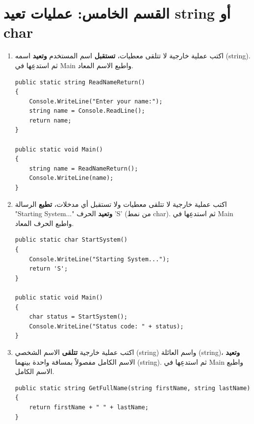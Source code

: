 \documentclass[14pt]{extarticle}
\begin{document}
\filbreak
\section*{القسم الخامس: عمليات تعيد \textenglish{string} أو \textenglish{char}}

\begin{enumerate}[resume, itemsep=1em]

\item اكتب عملية خارجية لا تتلقى معطيات، \textbf{تستقبل} اسم المستخدم \textbf{وتعيد} اسمه (\textenglish{string}). ثم استدعِها في \textenglish{Main} واطبع الاسم المعاد.
\ifwithsols
\begin{boxSolution}
\begin{english}
\begin{verbatim}
public static string ReadNameReturn()
{
    Console.WriteLine("Enter your name:");
    string name = Console.ReadLine();
    return name;
}

public static void Main()
{
    string name = ReadNameReturn();
    Console.WriteLine(name);
}
\end{verbatim}
\end{english}
\end{boxSolution}
\fi
\filbreak

\item اكتب عملية خارجية لا تتلقى معطيات ولا تستقبل أي مدخلات، \textbf{تطبع} الرسالة \textenglish{"Starting System..."} \textbf{وتعيد} الحرف \textenglish{'S'} (من نمط \textenglish{char}). ثم استدعِها في \textenglish{Main} واطبع الحرف المعاد.
\ifwithsols
\begin{boxSolution}
\begin{english}
\begin{verbatim}
public static char StartSystem()
{
    Console.WriteLine("Starting System...");
    return 'S';
}

public static void Main()
{
    char status = StartSystem();
    Console.WriteLine("Status code: " + status);
}
\end{verbatim}
\end{english}
\end{boxSolution}
\fi
\filbreak

\item اكتب عملية خارجية \textbf{تتلقى} الاسم الشخصي (\textenglish{string}) واسم العائلة (\textenglish{string})، \textbf{وتعيد} الاسم الكامل مفصولاً بمسافة واحدة بينهما (\textenglish{string}). ثم استدعِها في \textenglish{Main} واطبع الاسم الكامل.
\ifwithsols
\begin{boxSolution}
\begin{english}
\begin{verbatim}
public static string GetFullName(string firstName, string lastName)
{
    return firstName + " " + lastName;
}


\end{verbatim}
\end{english}
\end{boxSolution}
\end{enumerate}
\end{document}
